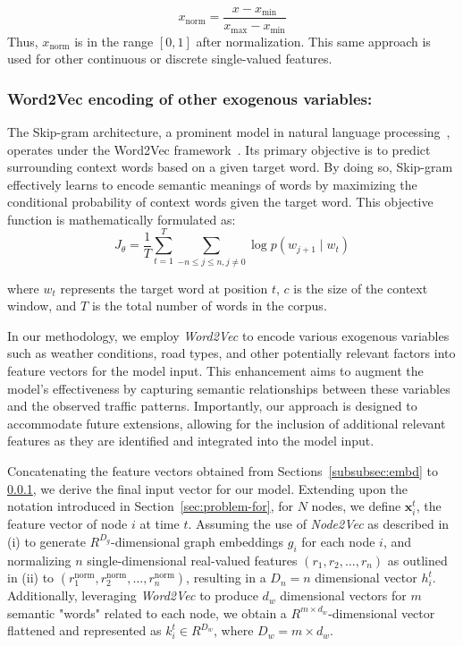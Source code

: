 \[ x_{\text{norm}} = \frac{x - x_{\text{min}}}{x_{\text{max}} - x_{\text{min}}} \]
Thus, \( x_{\text{norm}} \) is in the range \([0,1]\) after normalization.
This same approach is used for other continuous or discrete single-valued features.

\subsubsection{Word2Vec encoding of other exogenous variables:}\label{subsubsec:encode}
The Skip-gram architecture, a prominent model in natural language processing~\cite{skipgram}, operates under the Word2Vec framework~\cite{word2vec}. Its primary objective is to predict surrounding context words based on a given target word. By doing so, Skip-gram effectively learns to encode semantic meanings of words by maximizing the conditional probability of context words given the target word. This objective function is mathematically formulated as:
\[
J_\theta = \frac{1}{T}\sum^{T}_{t=1}\sum_{-n\leq j \leq n, j \neq 0}\log p\left(w_{j+1} \mid w_{t}\right)
\]

where \( w_t \) represents the target word at position \( t \), \( c \) is the size of the context window, and \( T \) is the total number of words in the corpus.

In our methodology, we employ \textit{Word2Vec} \cite{word2vec} to encode various exogenous variables such as weather conditions, road types, and other potentially relevant factors into feature vectors for the model input. This enhancement aims to augment the model's effectiveness by capturing semantic relationships between these variables and the observed traffic patterns. Importantly, our approach is designed to accommodate future extensions, allowing for the inclusion of additional relevant features as they are identified and integrated into the model input.

Concatenating the feature vectors obtained from Sections~\ref{subsubsec:embd} to \ref{subsubsec:encode}, we derive the final input vector for our model. Extending upon the notation introduced in Section~\ref{sec:problem-for}, for $N$ nodes, we define $\mathbf{x}_i^t$, the feature vector of node $i$ at time $t$. Assuming the use of \textit{Node2Vec} as described in (i) to generate $R^{D_g}$-dimensional graph embeddings $g_i$ for each node $i$, and normalizing $n$ single-dimensional real-valued features $(r_1, r_2, \ldots, r_n)$ as outlined in (ii) to $(r_1^{\text{norm}}, r_2^{\text{norm}}, \ldots, r_n^{\text{norm}})$, resulting in a $D_n = n$ dimensional vector $h_i^t$. Additionally, leveraging \textit{Word2Vec} to produce $d_w$ dimensional vectors for $m$ semantic "words" related to each node, we obtain a $R^{m \times d_w}$-dimensional vector flattened and represented as $k_i^t \in R^{D_w}$, where $D_w = m \times d_w$.

